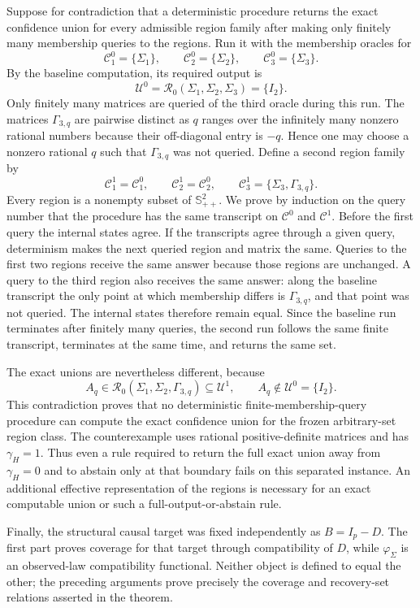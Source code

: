 Suppose for contradiction that a deterministic procedure returns the exact confidence union for every admissible region family after making only finitely many membership queries to the regions.  Run it with the membership oracles for
\[
 \mathcal C^0_1=\{\Sigma_1\},\qquad
 \mathcal C^0_2=\{\Sigma_2\},\qquad
 \mathcal C^0_3=\{\Sigma_3\}.
\]
By the baseline computation, its required output is
\[
 \mathcal U^0=\mathcal R_0(\Sigma_1,\Sigma_2,\Sigma_3)=\{I_2\}.
\]
Only finitely many matrices are queried of the third oracle during this run.  The matrices \(\Gamma_{3,q}\) are pairwise distinct as \(q\) ranges over the infinitely many nonzero rational numbers because their off-diagonal entry is \(-q\).  Hence one may choose a nonzero rational \(q\) such that \(\Gamma_{3,q}\) was not queried.  Define a second region family by
\[
 \mathcal C^1_1=\mathcal C^0_1,\qquad
 \mathcal C^1_2=\mathcal C^0_2,\qquad
 \mathcal C^1_3=\{\Sigma_3,\Gamma_{3,q}\}.
\]
Every region is a nonempty subset of \(\mathbb S_{++}^2\).  We prove by induction on the query number that the procedure has the same transcript on \(\mathcal C^0\) and \(\mathcal C^1\).  Before the first query the internal states agree.  If the transcripts agree through a given query, determinism makes the next queried region and matrix the same.  Queries to the first two regions receive the same answer because those regions are unchanged.  A query to the third region also receives the same answer: along the baseline transcript the only point at which membership differs is \(\Gamma_{3,q}\), and that point was not queried.  The internal states therefore remain equal.  Since the baseline run terminates after finitely many queries, the second run follows the same finite transcript, terminates at the same time, and returns the same set.

The exact unions are nevertheless different, because
\[
 A_q\in\mathcal R_0(\Sigma_1,\Sigma_2,\Gamma_{3,q})
 \subseteq\mathcal U^1,
 \qquad
 A_q\notin\mathcal U^0=\{I_2\}.
\]
This contradiction proves that no deterministic finite-membership-query procedure can compute the exact confidence union for the frozen arbitrary-set region class.  The counterexample uses rational positive-definite matrices and has \(\gamma_H=1\).  Thus even a rule required to return the full exact union away from \(\gamma_H=0\) and to abstain only at that boundary fails on this separated instance.  An additional effective representation of the regions is necessary for an exact computable union or such a full-output-or-abstain rule.

Finally, the structural causal target was fixed independently as \(B=I_p-D\).  The first part proves coverage for that target through compatibility of \(D\), while \(\varphi_\Sigma\) is an observed-law compatibility functional.  Neither object is defined to equal the other; the preceding arguments prove precisely the coverage and recovery-set relations asserted in the theorem.